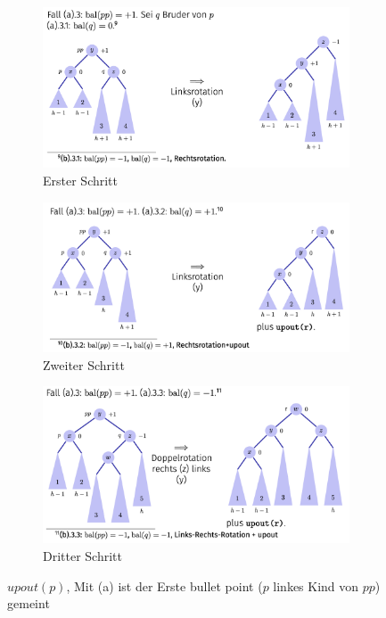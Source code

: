 \documentclass[a4paper]{article}
\begin{document}
\begin{figure}[h!]
\centering
\begin{subfigure}{0.38\textwidth}
    \includegraphics[width=\textwidth]{Pictures/upout1.png}
        \caption{Erster Schritt}
        \label{fig: upout1}
\end{subfigure}
\hfill
\begin{subfigure}{0.38\textwidth}
 \includegraphics[width=\textwidth]{Pictures/upout2.png}  
 \caption{Zweiter Schritt}
        \label{fig: upout2}
\end{subfigure}

\begin{subfigure}{0.38\textwidth}
 \includegraphics[width=\textwidth]{Pictures/upout3.png}
        \caption{Dritter Schritt}
        \label{fig: upout3}
\end{subfigure}
        
\caption{$upout(p)$, Mit (a) ist der Erste bullet point ($p$ linkes Kind von $pp$) gemeint}
\label{fig: upout(p)}
\end{figure}
\end{document}
